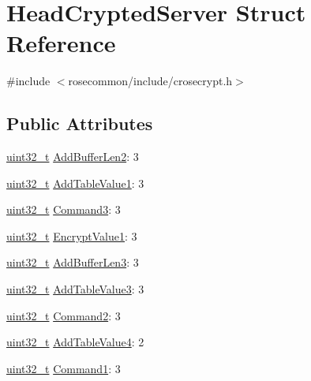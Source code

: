 \hypertarget{structHeadCryptedServer}{}\section{Head\+Crypted\+Server Struct Reference}
\label{structHeadCryptedServer}


{\ttfamily \#include $<$rosecommon/include/crosecrypt.\+h$>$}

\subsection*{Public Attributes}
\begin{DoxyCompactItemize}
\item 
\hyperlink{stdint_8h_a435d1572bf3f880d55459d9805097f62}{uint32\+\_\+t} \hyperlink{structHeadCryptedServer_a57e7f8eecda07e71386e9bf563069d06}{Add\+Buffer\+Len2}\+: 3
\item 
\hyperlink{stdint_8h_a435d1572bf3f880d55459d9805097f62}{uint32\+\_\+t} \hyperlink{structHeadCryptedServer_a07bcf9042a8113425469c4089c27525b}{Add\+Table\+Value1}\+: 3
\item 
\hyperlink{stdint_8h_a435d1572bf3f880d55459d9805097f62}{uint32\+\_\+t} \hyperlink{structHeadCryptedServer_ac0f220db12d1f8d140c51b33df7a8043}{Command3}\+: 3
\item 
\hyperlink{stdint_8h_a435d1572bf3f880d55459d9805097f62}{uint32\+\_\+t} \hyperlink{structHeadCryptedServer_ac7eb21ed5fab9631dcbbf53a323074ad}{Encrypt\+Value1}\+: 3
\item 
\hyperlink{stdint_8h_a435d1572bf3f880d55459d9805097f62}{uint32\+\_\+t} \hyperlink{structHeadCryptedServer_abe18fbbff9ed9d0ff3d7a5a1494b3beb}{Add\+Buffer\+Len3}\+: 3
\item 
\hyperlink{stdint_8h_a435d1572bf3f880d55459d9805097f62}{uint32\+\_\+t} \hyperlink{structHeadCryptedServer_acfd3610f3ef9982bcecda8743ae5d95a}{Add\+Table\+Value3}\+: 3
\item 
\hyperlink{stdint_8h_a435d1572bf3f880d55459d9805097f62}{uint32\+\_\+t} \hyperlink{structHeadCryptedServer_a10d0b8c9f830073c44c56820c7b0a943}{Command2}\+: 3
\item 
\hyperlink{stdint_8h_a435d1572bf3f880d55459d9805097f62}{uint32\+\_\+t} \hyperlink{structHeadCryptedServer_a7104d2e51ecfb3536a0b307f66adfd4f}{Add\+Table\+Value4}\+: 2
\item 
\hyperlink{stdint_8h_a435d1572bf3f880d55459d9805097f62}{uint32\+\_\+t} \hyperlink{structHeadCryptedServer_ad7c01b75654dc34a9046ad05f3d49f9d}{Command1}\+: 3

\end{DoxyCompactItemize}
